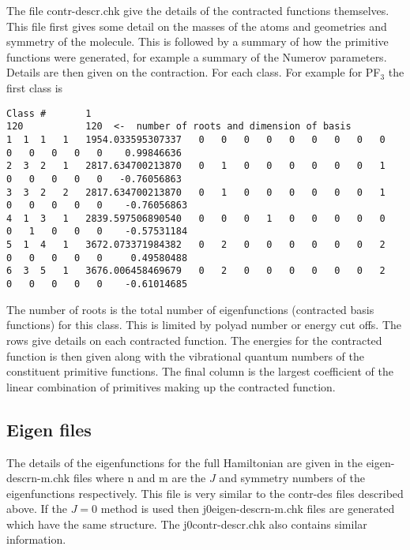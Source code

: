 The file contr-descr.chk give the details of the contracted functions themselves. This file first gives some detail
on the masses of the atoms and geometries and symmetry of the molecule. This is followed by a summary of how the primitive
functions were generated, for example a summary of the Numerov parameters. Details are then given on the contraction. For 
each class. For example for PF$_3$ the first class is
\begin{verbatim}
Class #       1
120           120  <-  number of roots and dimension of basis
1  1  1   1   1954.033595307337   0   0   0   0   0   0   0   0   0   0   0   0   0   0    0.99846636
2  3  2   1   2817.634700213870   0   1   0   0   0   0   0   0   1   0   0   0   0   0   -0.76056863
3  3  2   2   2817.634700213870   0   1   0   0   0   0   0   0   1   0   0   0   0   0    -0.76056863
4  1  3   1   2839.597506890540   0   0   0   1   0   0   0   0   0   0   1   0   0   0    -0.57531184
5  1  4   1   3672.073371984382   0   2   0   0   0   0   0   0   2   0   0   0   0   0     0.49580488
6  3  5   1   3676.006458469679   0   2   0   0   0   0   0   0   2   0   0   0   0   0    -0.61014685
\end{verbatim}
The number of roots is the total number of eigenfunctions (contracted basis functions) for this class. This is limited by
polyad number or energy cut offs. The rows give details on each contracted function. The 
energies for the contracted function is then given along with the vibrational quantum numbers of the constituent 
primitive functions. The final column is the largest coefficient of the linear combination of primitives making up the 
contracted function. 


\subsection{Eigen files}

The details of the eigenfunctions for the full Hamiltonian are given in the  eigen-descrn-m.chk files where n and m are the
$J$ and symmetry numbers of the eigenfunctions respectively. This file is very similar to the contr-des files described 
above. If the $J=0$ method is used then j0eigen-descrn-m.chk files are generated which have the same structure. The 
 j0contr-descr.chk also contains similar information.
 
 
 
 


































